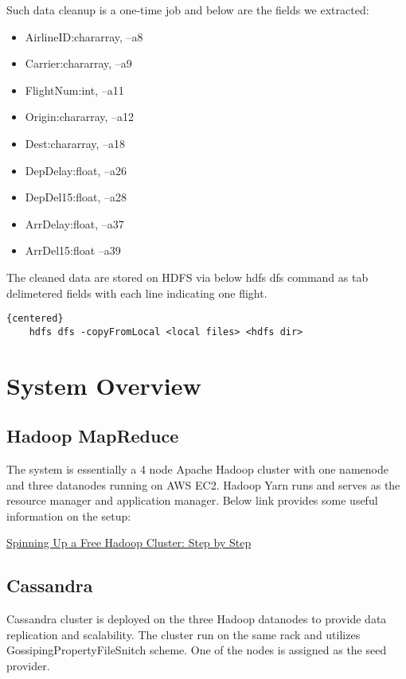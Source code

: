 \documentclass[fontsize=11pt,paper=a4,pagesize=auto]{report}
\begin{document}
\par Such data cleanup is a one-time job and below are the fields we extracted: 
\begin{itemize}
\item       AirlineID:chararray, --a8
\item       Carrier:chararray,   --a9
\item       FlightNum:int,       --a11
\item       Origin:chararray,    --a12       
\item       Dest:chararray,      --a18
\item       DepDelay:float,      --a26
\item       DepDel15:float,      --a28
\item       ArrDelay:float,      --a37 
\item       ArrDel15:float       --a39
\end{itemize}

\par The cleaned data are stored on HDFS via below hdfs dfs command  as tab delimetered fields with each line indicating one flight. 
\begin{lstlisting}{centered}
	hdfs dfs -copyFromLocal <local files> <hdfs dir>  
\end{lstlisting}
 
\section{System Overview}
\subsection{Hadoop MapReduce}
The system is essentially a 4 node Apache Hadoop cluster with one namenode and three datanodes running on AWS EC2. 
Hadoop Yarn runs and serves as the resource manager and application manager. Below link provides some useful information on the setup: 

\href{https://blog.insightdatascience.com/spinning-up-a-free-hadoop-cluster-step-by-step-c406d56bae42}{Spinning Up a Free Hadoop Cluster: Step by Step}


\subsection{Cassandra} 
Cassandra cluster is deployed on the three Hadoop datanodes to provide data replication and scalability. 
The cluster run on the same rack and utilizes GossipingPropertyFileSnitch scheme. One of the nodes is assigned as the seed provider.
 
\end{document}
